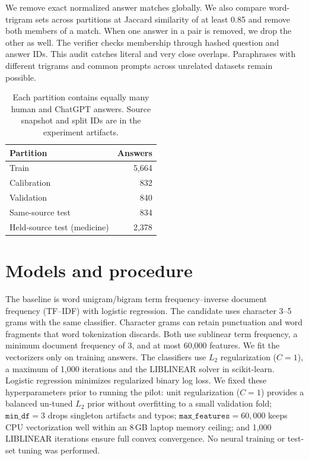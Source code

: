 \documentclass[11pt]{article}
\begin{document}
We remove exact normalized answer matches globally. We also compare word-trigram sets across partitions at Jaccard similarity of at least 0.85 and remove both members of a match. When one answer in a pair is removed, we drop the other as well. The verifier checks membership through hashed question and answer IDs. This audit catches literal and very close overlaps. Paraphrases with different trigrams and common prompts across unrelated datasets remain possible.

\begin{table}[h]
\centering
\begin{tabular}{lr}
\toprule
Partition & Answers \\
\midrule
Train & 5,664 \\
Calibration & 832 \\
Validation & 840 \\
Same-source test & 834 \\
Held-source test (medicine) & 2,378 \\
\bottomrule
\end{tabular}
\caption{Each partition contains equally many human and ChatGPT answers. Source snapshot and split IDs are in the experiment artifacts.}
\label{tab:splits}
\end{table}

\section{Models and procedure}

The baseline is word unigram/bigram term frequency--inverse document frequency (TF--IDF) with logistic regression. The candidate uses character 3--5 grams with the same classifier. Character grams can retain punctuation and word fragments that word tokenization discards. Both use sublinear term frequency, a minimum document frequency of 3, and at most 60,000 features. We fit the vectorizers only on training answers. The classifiers use $L_2$ regularization ($C=1$), a maximum of 1,000 iterations and the LIBLINEAR solver in scikit-learn. Logistic regression minimizes regularized binary log loss. We fixed these hyperparameters prior to running the pilot: unit regularization ($C=1$) provides a balanced un-tuned $L_2$ prior without overfitting to a small validation fold; $\texttt{min\_df}=3$ drops singleton artifacts and typos; $\texttt{max\_features}=60{,}000$ keeps CPU vectorization well within an 8\,GB laptop memory ceiling; and 1,000 LIBLINEAR iterations ensure full convex convergence. No neural training or test-set tuning was performed.
\end{document}

